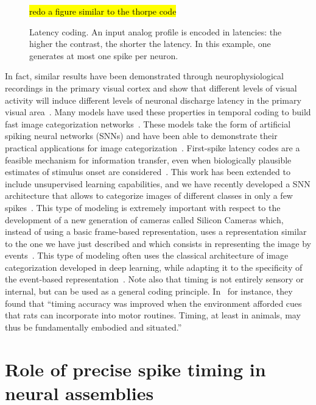 \documentclass[brainsci, %
               review,submit,pdftex,moreauthors%
               ]{Definitions/mdpi}
\newcommand{\note}[1]{{\sethlcolor{yellow}\hl{#1}}}
\begin{document}
\begin{figure}
\centering
\note{redo a figure similar to the thorpe code}%
\caption{Latency coding. An input analog profile is encoded in latencies: the higher the contrast, the shorter the latency. In this example, one generates at most one spike per neuron.
}\label{fig:roc}
\end{figure}
In fact, similar results have been demonstrated through neurophysiological recordings in the primary visual cortex and show that different levels of visual activity will induce different levels of neuronal discharge latency in the primary visual area~\citep{celebrini_dynamics_1993}. Many models have used these properties in temporal coding to build fast image categorization networks~\citep{gautrais_rate_1998,delorme_spikenet_1999, perrinet_coding_2004}. These models take the form of artificial spiking neural networks (SNNs) and have been able to demonstrate their practical applications for image categorization~\citep{delorme_ultra-rapid_2000}. First-spike latency codes are a feasible mechanism for information transfer, even when biologically plausible estimates of stimulus onset are considered~\citep{chase_first-spike_2007}. This work has been extended to include unsupervised learning capabilities, and we have recently developed a SNN architecture that allows to categorize images of different classes in only a few spikes~\citep{grimaldi_homeostatic_2021,grimaldi_robust_2022}. This type of modeling is extremely important with respect to the development of a new generation of cameras called Silicon Cameras which, instead of using a basic frame-based representation, uses a representation similar to the one we have just described and which consists in representing the image by events~\citep{rasetto_challenges_2022}. This type of modeling often uses the classical architecture of image categorization developed in deep learning, while adapting it to the specificity of the event-based representation~\citep{goltz_fast_2021}. Note also that timing is not entirely sensory or internal, but can be used as a general coding principle. In~\citep{safaie_turning_2020} for instance, they found that ``timing accuracy was improved when the environment afforded cues that rats can incorporate into motor routines. Timing, at least in animals, may thus be fundamentally embodied and situated.'' 
%
\section{Role of precise spike timing in neural assemblies}
\end{document}

